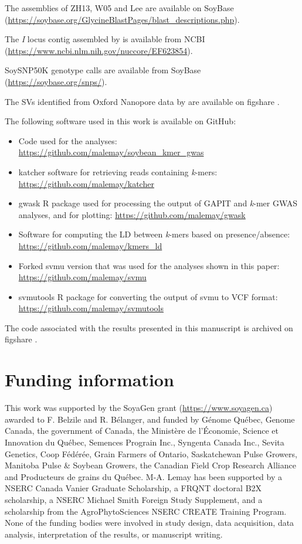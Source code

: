 \documentclass{article}
\begin{document}
The assemblies of ZH13, W05 and Lee are available on SoyBase
(\url{https://soybase.org/GlycineBlastPages/blast_descriptions.php}).

The \textit{I} locus contig assembled by  is available from
NCBI (\url{https://www.ncbi.nlm.nih.gov/nuccore/EF623854}).

SoySNP50K genotype calls are available from SoyBase (\url{https://soybase.org/snps/}).

The SVs identified from Oxford Nanopore data by  are available
on figshare .

The following software used in this work is available on GitHub:

\begin{itemize}
	\item Code used for the analyses:
		\url{https://github.com/malemay/soybean_kmer_gwas}
	\item katcher software for retrieving reads containing \textit{k}-mers:
		\url{https://github.com/malemay/katcher}
	\item gwask R package used for processing the output of GAPIT and
		\textit{k}-mer GWAS analyses, and for plotting:
		\url{https://github.com/malemay/gwask}
	\item Software for computing the LD between \textit{k}-mers
		based on presence/absence: \url{https://github.com/malemay/kmers_ld}
	\item Forked svmu version that was used for the analyses shown in this
		paper: \url{https://github.com/malemay/svmu}
	\item svmutools R package for converting the output of svmu to VCF
		format: \url{https://github.com/malemay/svmutools}
\end{itemize}

The code associated with the results presented in this manuscript is archived
on figshare .

\section*{Funding information}

This work was supported by the SoyaGen grant (\url{https://www.soyagen.ca})
awarded to F. Belzile and R. Bélanger, and funded by Génome Québec, Genome
Canada, the government of Canada, the Ministère de l'Économie, Science et
Innovation du Québec, Semences Prograin Inc., Syngenta Canada Inc., Sevita
Genetics, Coop Fédérée, Grain Farmers of Ontario, Saskatchewan Pulse Growers,
Manitoba Pulse \& Soybean Growers, the Canadian Field Crop Research Alliance
and Producteurs de grains du Québec. M-A. Lemay has been supported by a NSERC
Canada Vanier Graduate Scholarship, a FRQNT doctoral B2X scholarship, a NSERC
Michael Smith Foreign Study Supplement, and a scholarship from the
AgroPhytoSciences NSERC CREATE Training Program. None of the funding bodies
were involved in study design, data acquisition, data analysis, interpretation
of the results, or manuscript writing.
\end{document}
